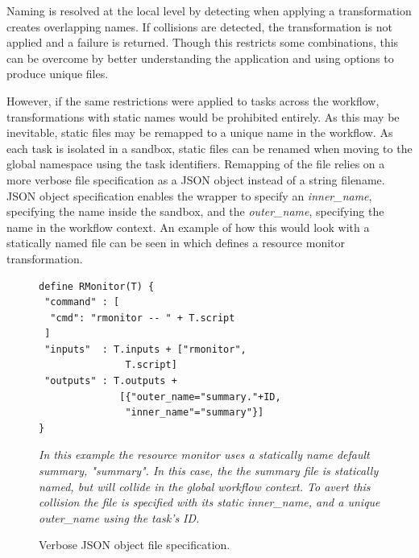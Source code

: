 \documentclass[conference]{IEEEtran}
\begin{document}
Naming is resolved at the local level by detecting
when applying a transformation 
creates overlapping names.
If collisions are detected, the 
transformation is not applied and
a failure is returned.
Though this restricts some combinations, 
this can be overcome by 
better understanding the application
and using options to 
produce unique files.


However, if the same restrictions were
applied to tasks across the workflow,
transformations with static names would
be prohibited entirely.
As this may be inevitable,
static files may be remapped
to a unique name in the workflow.
As each task is isolated in a sandbox, 
static files can be renamed when moving to the 
global namespace using the task identifiers. 
Remapping of the file relies on
a more verbose file specification as
a JSON object instead of a string filename.
JSON object specification enables the wrapper
to specify an \emph{inner\_name}, 
specifying the name inside the sandbox,
and the \emph{outer\_name},
specifying the name in the workflow context. 
An example of how this would look with
a statically named file can be seen in 
 which defines a resource
monitor transformation.

\begin{figure}[h]
\begin{framed}
\small
\begin{verbatim}
define RMonitor(T) {
 "command" : [
  "cmd": "rmonitor -- " + T.script
 ]
 "inputs"  : T.inputs + ["rmonitor",
               T.script]
 "outputs" : T.outputs +
              [{"outer_name="summary."+ID, 
               "inner_name"="summary"}]
}
\end{verbatim}
\end{framed}
\caption{Verbose JSON object file specification.} 
\small
\emph{In this example the resource monitor uses
a statically name default summary, "summary".
In this case, the the summary 
file is statically named, but will collide in
the global workflow context. To avert this
collision the file is specified with its 
static inner\_name, and a unique outer\_name
using the task's ID.}
\label{json-file}
\end{figure}
\end{document}
